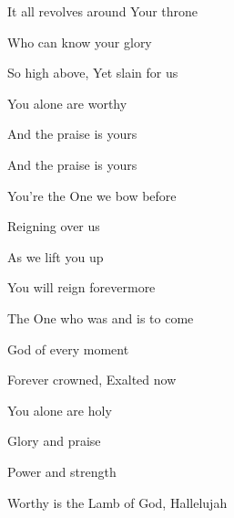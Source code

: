 \documentclass[9pt]{extarticle}
\begin{document}
\bsong

\bi

\ei

\bv
It all revolves around Your throne

Who can know your glory

So high above, Yet slain for us

You alone are worthy
\ev

\bc
And the praise is yours

And the praise is yours

You’re the One we bow before

Reigning over us

As we lift you up

You will reign forevermore
\ec

\bv
The One who was and is to come

God of every moment

Forever crowned, Exalted now

You alone are holy
\ev


\bb[4]
Glory and praise

Power and strength

Worthy is the Lamb of God, Hallelujah
\eb


\bo

\eo

\esong
\end{document}
